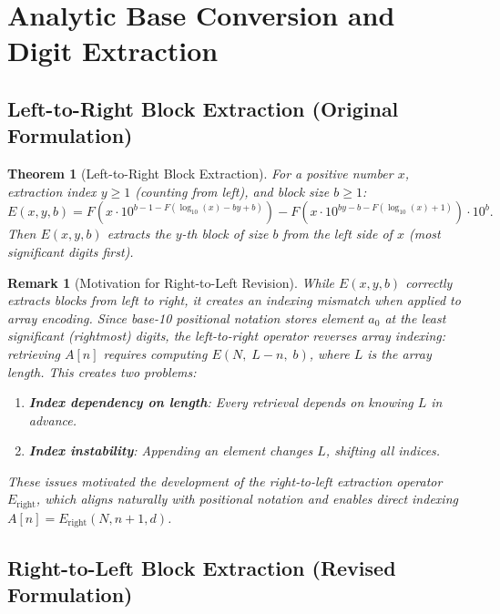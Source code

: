 \documentclass[12pt, a4paper]{article}
\theoremstyle{note}
\newtheorem{theorem}{Theorem}[section]
\newtheorem{remark}{Remark}[section]
\begin{document}
\section{Analytic Base Conversion and Digit Extraction}

\subsection{Left-to-Right Block Extraction (Original Formulation)}

\begin{theorem}[Left-to-Right Block Extraction]\label{thm:left_block}
For a positive number $x$, extraction index $y \geq 1$ (counting from left), and block size $b \geq 1$:
\[
E(x, y, b) = F\!\left(x \cdot 10^{b-1-F\left(\log_{10}(x)-by+b\right)}\right) - F\!\left(x \cdot 10^{by-b-F\left(\log_{10}(x)+1\right)}\right) \cdot 10^{b}.
\]
Then $E(x, y, b)$ extracts the $y$-th block of size $b$ from the left side of $x$ (most significant digits first).
\end{theorem}

\begin{remark}[Motivation for Right-to-Left Revision]
\label{rem:left_motivation}
While $E(x, y, b)$ correctly extracts blocks from left to right, it creates an indexing mismatch when applied to array encoding. Since base-10 positional notation stores element $a_0$ at the least significant (rightmost) digits, the left-to-right operator reverses array indexing: retrieving $A[n]$ requires computing $E(N,\; L-n,\; b)$, where $L$ is the array length. This creates two problems:
\begin{enumerate}
    \item \textbf{Index dependency on length}: Every retrieval depends on knowing $L$ in advance.
    \item \textbf{Index instability}: Appending an element changes $L$, shifting all indices.
\end{enumerate}
These issues motivated the development of the right-to-left extraction operator $E_{\text{right}}$, which aligns naturally with positional notation and enables direct indexing $A[n] = E_{\text{right}}(N, n+1, d)$.
\end{remark}

\subsection{Right-to-Left Block Extraction (Revised Formulation)}
\label{sec:block}
\end{document}
